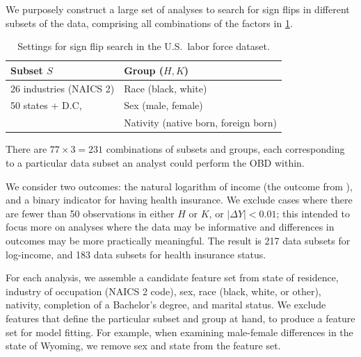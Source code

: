 We purposely construct a large set of analyses to search for sign flips in different subsets of the data, comprising all combinations of the factors in \cref{tab:us_census_design}.

\begin{table}[!ht]
    \caption{Settings for sign flip search in the U.S.\ labor force dataset.}
    \label{tab:us_census_design}
    \centering
    \footnotesize
    \setlength{\tabcolsep}{4pt}
    \begin{tabular}{@{}ll@{}}
    \toprule
    Subset \( S \) & Group (\( H, K \)) \\
    \midrule
    26 industries (NAICS 2) & Race (black, white)                  \\
    50 states + D.C,        & Sex (male, female)                   \\
                            & Nativity (native born, foreign born) \\
    \bottomrule
    \end{tabular}
\end{table}

There are \( 77 \times 3 = 231 \) combinations of subsets and groups, each corresponding to a particular data subset an analyst could perform the OBD within. %

We consider two outcomes: the natural logarithm of income (the outcome from \citet{bach2024heterogeneity}), and a binary indicator for having health insurance.
We exclude cases where there are fewer than 50 observations in either $H$ or $K$, or $|\Delta Y| < 0.01$; this intended to focus more on analyses where the data may be informative and differences in outcomes may be more practically meaningful.
The result is 217 data subsets for log-income, and 183 data subsets for health insurance status. %

For each analysis, we assemble a candidate feature set from state of residence, industry of occupation (NAICS 2 code), sex, race (black, white, or other), nativity, completion of a Bachelor's degree, and marital status.
We exclude features that define the particular subset and group at hand, to produce a feature set for model fitting.
For example, when examining male-female differences in the state of Wyoming, we remove sex and state from the feature set.

